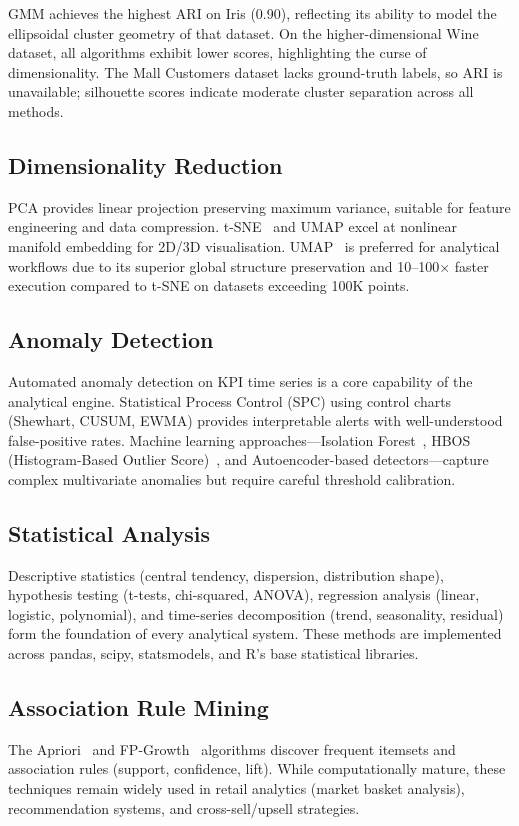 \documentclass[12pt, a4paper]{article}
\begin{document}
GMM achieves the highest ARI on Iris (0.90), reflecting its ability to model the ellipsoidal cluster geometry of that dataset. On the higher-dimensional Wine dataset, all algorithms exhibit lower scores, highlighting the curse of dimensionality. The Mall Customers dataset lacks ground-truth labels, so ARI is unavailable; silhouette scores indicate moderate cluster separation across all methods.

\subsection{Dimensionality Reduction}
PCA provides linear projection preserving maximum variance, suitable for feature engineering and data compression. t-SNE~\citep{vandermaaten2008tsne} and UMAP excel at nonlinear manifold embedding for 2D/3D visualisation. UMAP~\citep{mcinnes2018umap} is preferred for analytical workflows due to its superior global structure preservation and 10--100$\times$ faster execution compared to t-SNE on datasets exceeding 100K points.

\subsection{Anomaly Detection}
Automated anomaly detection on KPI time series is a core capability of the analytical engine. Statistical Process Control (SPC) using control charts (Shewhart, CUSUM, EWMA) provides interpretable alerts with well-understood false-positive rates. Machine learning approaches---Isolation Forest~\citep{liu2008isolation}, HBOS (Histogram-Based Outlier Score)~\citep{goldstein2012hbos}, and Autoencoder-based detectors---capture complex multivariate anomalies but require careful threshold calibration.

\subsection{Statistical Analysis}
Descriptive statistics (central tendency, dispersion, distribution shape), hypothesis testing (t-tests, chi-squared, ANOVA), regression analysis (linear, logistic, polynomial), and time-series decomposition (trend, seasonality, residual) form the foundation of every analytical system. These methods are implemented across pandas, scipy, statsmodels, and R's base statistical libraries.

\subsection{Association Rule Mining}
The Apriori~\citep{agrawal1994apriori} and FP-Growth~\citep{han2000fpgrowth} algorithms discover frequent itemsets and association rules (support, confidence, lift). While computationally mature, these techniques remain widely used in retail analytics (market basket analysis), recommendation systems, and cross-sell/upsell strategies.
\end{document}
